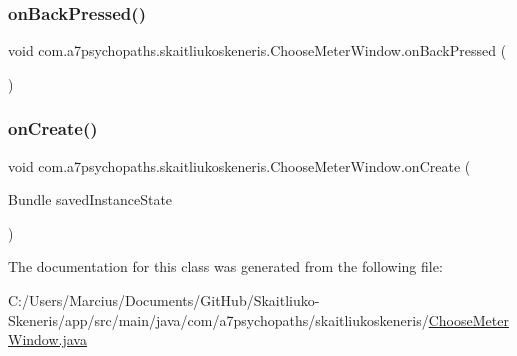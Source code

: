 \subsubsection{\texorpdfstring{on\+Back\+Pressed()}{onBackPressed()}}
{\footnotesize\ttfamily void com.\+a7psychopaths.\+skaitliukoskeneris.\+Choose\+Meter\+Window.\+on\+Back\+Pressed (\begin{DoxyParamCaption}{ }\end{DoxyParamCaption})}

\mbox{\label{classcom_1_1a7psychopaths_1_1skaitliukoskeneris_1_1_choose_meter_window_aaf036587257bb5ccee2c5d10dd492b33}} 
\subsubsection{\texorpdfstring{on\+Create()}{onCreate()}}
{\footnotesize\ttfamily void com.\+a7psychopaths.\+skaitliukoskeneris.\+Choose\+Meter\+Window.\+on\+Create (\begin{DoxyParamCaption}\item[{Bundle}]{saved\+Instance\+State }\end{DoxyParamCaption})\hspace{0.3cm}{\ttfamily [protected]}}



The documentation for this class was generated from the following file\+:\begin{DoxyCompactItemize}
\item 
C\+:/\+Users/\+Marcius/\+Documents/\+Git\+Hub/\+Skaitliuko-\/\+Skeneris/app/src/main/java/com/a7psychopaths/skaitliukoskeneris/\mbox{\hyperlink{_choose_meter_window_8java}{Choose\+Meter\+Window.\+java}}\end{DoxyCompactItemize}
